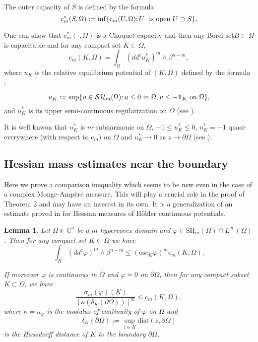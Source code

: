 \documentclass[12pt]{amsart}
\newtheorem{lemma}[theorem]{Lemma}
\theoremstyle{definition}
\numberwithin{theorem}{section}
\numberwithin{equation}{section}
\newcommand{\C}{\mathbb{C}}
\begin{document}
The outer capacity of $S$ is defined by the formula 
$$
\text{c}^*_m(S,\Omega) := \inf \{\text{c}_m(U,\Omega) ; U \, \, \hbox{ is open} \, \, U \supset S\}, 
$$ 

One can show that $\text{c}^*_m(\cdot,\Omega)$ is a Choquet capacity and then  any Borel set$ B \subset \Omega$ is capacitable and
for any compact set $K \subset \Omega$, 
 \begin{equation} \label{eq:cap}
 \text{c}_m(K,\Omega)=\int_{\Omega}(dd^c u_K^*)^m\wedge\beta^{n-m},
 \end{equation}
  where $u_K$ is the relative equilibrium potential of $(K,\Omega)$ defined by the formula :
  
 $$
 u_K:=\sup\{u\in \mathcal{SH}_m(\Omega);u\leq0\ \hbox{in}\ \Omega, u\leq-{\bf 1}_K  \, \, \mathrm{on } \, \, \Omega\},
 $$
 and $u_K^*$ is its upper semi-continuous regularization on $\Omega$ (see \cite{Lu12}).
 
 It is well knwon that $u_K^*$ is $m$-subharmonic on $\Omega$, $- 1 \leq u_K^* \leq 0$, $u_K^* = - 1$ quasi-everywhere (with respect to $ \text{c}_m$) on $\Omega$ and $u_K^* \to 0$ as $z \to \partial \Omega$ (see \cite{Lu12}).
 

\subsection{Hessian mass estimates near the boundary} %

Here we prove a comparison inequality which seems to be new even in the case of a complex  Monge-Amp\`ere measure. This will play a crucial role in the proof of Theorem 2  and may have an interest in its own. It is a generalization of an estimate proved in \cite{BZ20} for Hessian measures of H\"older continuous potentials.
\begin{lemma} \label{lem:ComparisonIneq} Let $\Omega \Subset \C^n$ be a $m$-hypercovex domain and 
 $\varphi \in \mathrm{SH}_m (\Omega) \cap L^{\infty}  (\Omega)$. Then for any compact set $K \subset \Omega$ we have
$$
\int_K (dd^c \varphi)^m \wedge \beta^{n - m}  \leq  (\text{osc}_K  \varphi)^m  \text{c}_m (K,\Omega).
$$

If moreover $\varphi$ is continuous in $\bar \Omega$ and $\varphi = 0$ on $\partial \Omega$,  then for any compact subset $K \subset \Omega$, we have
 $$
 \frac{\sigma_m (\varphi) (K)}{\left[\kappa (\delta_K (\partial \Omega))\right]^m}  \leq   \text{c}_m (K,\Omega),
 $$
 where $\kappa = \kappa_\varphi$ is the  modulus of continuity of $\varphi$ on $\bar{\Omega}$ and 
 $$\delta_K (\partial \Omega) := \sup_{z \in K}  \mathrm{dist} (z,\partial \Omega)
 $$
  is the Hausdorff distance of $K$ to the boundary $\partial \Omega$.
\end{lemma}
\end{document}
